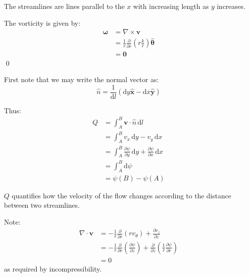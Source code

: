 \documentclass[12pt]{article}
\begin{document}
The streamlines are lines parallel to the $x$ with increasing length as $y$ increases.

The vorticity is given by:
\begin{equation}
    \begin{split}
        \mathbf{\omega} &= \nabla \times \mathbf{v} \\
        &= \frac{1}{r} \frac{\partial}{\partial r} \left( r \frac{k}{r} \right) \hat{\mathbf{\theta}} \\
        &= \mathbf{0}
    \end{split}
\end{equation}
\qed



First note that we may write the normal vector as:
\begin{equation}
    \hat{n} = \frac{1}{\mathrm{d}l} (\mathrm{d}y \hat{\mathbf{x}} - \mathrm{d}x \hat{\mathbf{y}})
\end{equation}

Thus:
\begin{equation}
    \begin{split}
        Q &= \int_{A}^{B} \mathbf{v} \cdot \hat{n} \, \mathrm{d}l \\
        &= \int_{A}^{B} v_{x} \, \mathrm{d}y - v_{y} \, \mathrm{d}x \\
        &= \int_{A}^{B} \frac{\partial \psi}{\partial y} \, \mathrm{d}y + \frac{\partial \psi}{\partial x} \, \mathrm{d}x \\
        &= \int_{A}^{B} \mathrm{d}\psi \\
        &= \psi(B) - \psi(A)
    \end{split}
\end{equation}

$Q$ quantifies how the velocity of the flow changes according to the distance between two streamlines.

Note:
\begin{equation}
    \begin{split}
        \nabla \cdot \mathbf{v} &= -\frac{1}{r} \frac{\partial}{\partial r} \left( r v_{\theta} \right) + \frac{\partial v_{z}}{\partial z} \\
        &= -\frac{1}{r} \frac{\partial}{\partial r} \left( \frac{\partial \psi}{\partial z} \right) + \frac{\partial}{\partial z} \left( \frac{1}{r} \frac{\partial \psi}{\partial r} \right) \\
        &= 0
    \end{split}
\end{equation}
as required by incompressibility.
\end{document}
